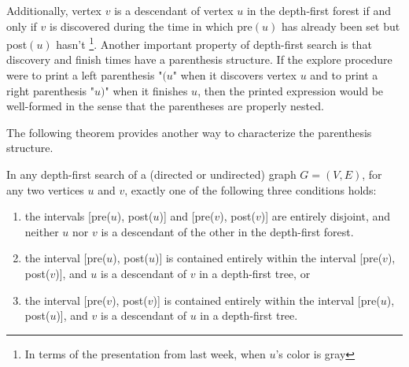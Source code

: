 Additionally, vertex $v$ is a descendant of vertex $u$ in the depth-first forest if and only if $v$ is discovered during the time in which pre$(u)$ has already been set but post$(u)$ hasn't \footnote{In terms of the presentation from last week, when $u$'s color is gray}.
Another important property of depth-first search is that discovery and finish times have a parenthesis structure. If the explore procedure were to print a left parenthesis "$(u$" when it discovers vertex $u$ and to print a right parenthesis "$u)$" when it finishes $u$, then the printed expression would be well-formed in the sense that the parentheses are properly nested.

The following theorem provides another way to characterize the parenthesis structure.

\begin{theorem}
In any depth-first search of a (directed or undirected) graph $G = (V, E)$, for any two vertices $u$ and $v$, exactly one of the following three conditions holds:

\begin{enumerate}
  \item the intervals [pre($u$), post($u$)] and [pre($v$), post($v$)] are entirely disjoint, and neither $u$ nor $v$ is a descendant of the other in the depth-first forest.
  \item the interval [pre($u$), post($u$)] is contained entirely within the interval [pre($v$), post($v$)], and $u$ is a descendant of $v$ in a depth-first tree, or
  \item the interval [pre($v$), post($v$)] is contained entirely within the interval [pre($u$), post($u$)], and $v$ is a descendant of $u$ in a depth-first tree.
  \end{enumerate}
\end{theorem}


